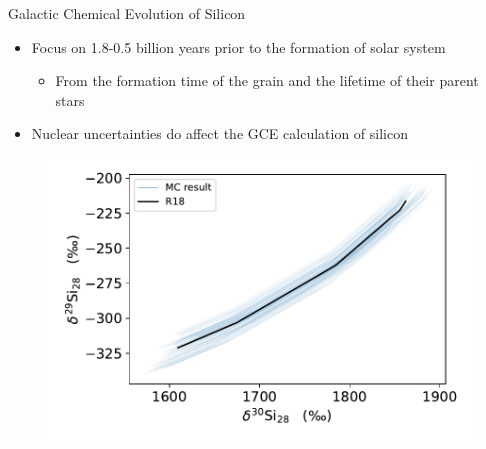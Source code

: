 \documentclass[10pt]{beamer}
\begin{document}
\begin{frame}{Galactic Chemical Evolution of Silicon}
    \begin{minipage}{5.5cm}
        \begin{itemize}
        \setlength\itemsep{2em}
            \item Focus on 1.8-0.5 billion years prior to the formation of solar system
            \begin{itemize}
                \item From the formation time of the grain and the lifetime of their parent stars
            \end{itemize}
            \item \alert{Nuclear uncertainties do affect the GCE calculation  of silicon}
        \end{itemize}
    \end{minipage}
    \begin{minipage}{6cm}
    \centering
        \begin{figure}
            \centering
            \includegraphics[width = \textwidth]{figs/GCE_2.pdf}
        \end{figure}
    \end{minipage}
    
\end{frame}
\end{document}
